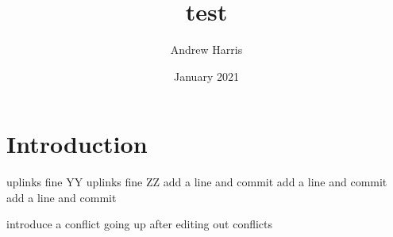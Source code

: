 \documentclass{article}
\title{test}
\author{Andrew Harris}
\date{January 2021}
\begin{document}
\maketitle

\section{Introduction}
uplinks fine YY
uplinks fine ZZ
add a line and commit
add a line and commit
add a line and commit

introduce a conflict going up
after editing out conflicts
\end{document}
